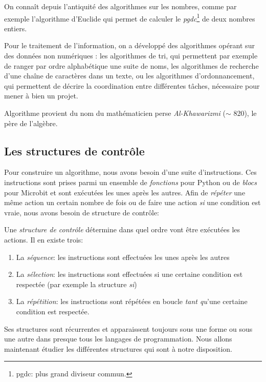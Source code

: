 \documentclass[11pt, a4paper]{book}
\begin{document}
On connaît depuis l'antiquité des algorithmes sur les nombres, comme par exemple l'algorithme d'Euclide qui permet de calculer le {\it pgdc}\footnote{pgdc: plus grand diviseur commun.} de deux nombres entiers.

Pour le traitement de l'information, on a développé des algorithmes opérant sur des données non numériques : les algorithmes de tri, qui permettent par exemple de ranger par ordre alphabétique une suite de noms, les algorithmes de recherche d'une chaîne de caractères dans un texte, ou les algorithmes d'ordonnancement, qui permettent de décrire la coordination entre différentes tâches, nécessaire pour mener à bien un projet.

Algorithme provient du nom du mathématicien perse {\it  Al-Khawarizmi} ($\sim$ 820), le père de l'algèbre.

\subsection{Les structures de contrôle}

Pour construire un algorithme, nous avons besoin d'une suite d'instructions. Ces instructions sont prises parmi un ensemble de {\it fonctions} pour Python  ou de {\it blocs} pour Microbit et sont exécutées les unes après les autres. Afin de {\it répéter} une même action un certain nombre de fois ou de faire une action {\it si} une condition est vraie, nous avons besoin de structure de contrôle:

\begin{defi}
Une {\it structure de contrôle } détermine dans quel ordre vont être exécutées les actions. Il en existe trois:
\begin{enumerate}
\item La {\it séquence}: les instructions sont effectuées les unes après les autres
\item La {\it sélection}: les instructions sont effectuées si une certaine
 condition est respectée (par exemple la structure {\it si})
\item La {\it répétition}: les instructions sont répétées en boucle {\it tant qu}'une certaine condition est respectée.
\end{enumerate}
\end{defi}

Ses structures sont récurrentes et apparaissent toujours sous une forme ou sous une autre dans presque tous les langages de programmation. Nous allons maintenant étudier les différentes structures qui sont à notre disposition.
\end{document}

